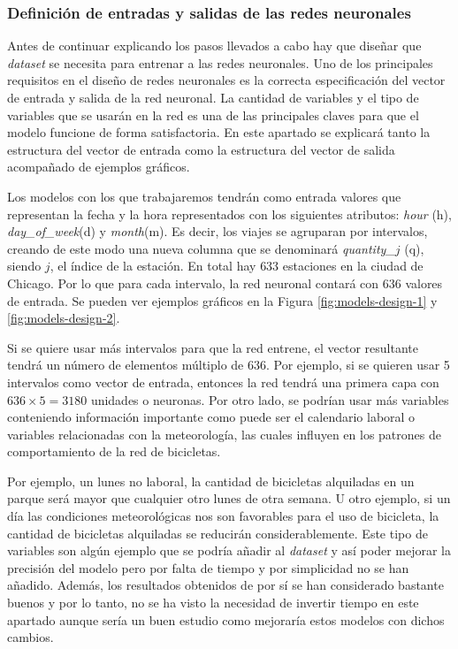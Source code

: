 \subsubsection{Definición de entradas y salidas de las redes neuronales}\label{inputs-outputs}

Antes de continuar explicando los pasos llevados a cabo hay que diseñar que \textit{dataset} se necesita para entrenar a las redes neuronales. Uno de los principales requisitos en el diseño de redes neuronales es la correcta especificación del vector de entrada y salida de la red neuronal. La cantidad de variables y el tipo de variables que se usarán en la red es una de las principales claves para que el modelo funcione de forma satisfactoria. En este apartado se explicará tanto la estructura del vector de entrada como la estructura del vector de salida acompañado de ejemplos gráficos.
\newline

Los modelos con los que trabajaremos tendrán como entrada valores que representan la fecha y la hora representados con los siguientes atributos: \textit{hour} (h), \textit{day\_of\_week}(d) y \textit{month}(m). Es decir, los viajes se agruparan por intervalos, creando de este modo una nueva columna que se denominará \textit{quantity\_$j$} (q), siendo $j$, el índice de la estación. En total hay $633$ estaciones en la ciudad de Chicago. Por lo que para cada intervalo, la red neuronal contará con $636$ valores de entrada. Se pueden ver ejemplos gráficos en la Figura \ref{fig:models-design-1} y \ref{fig:models-design-2}.
\newline

Si se quiere usar más intervalos para que la red entrene, el vector resultante tendrá un número de elementos múltiplo de $636$. Por ejemplo, si se quieren usar 5 intervalos como vector de entrada, entonces la red tendrá una primera capa con $636 \times 5 = 3180$ unidades o neuronas. Por otro lado, se podrían usar más variables conteniendo información importante como puede ser el calendario laboral o variables relacionadas con la meteorología, las cuales influyen en los patrones de comportamiento de la red de bicicletas.
\newline

Por ejemplo, un lunes no laboral, la cantidad de bicicletas alquiladas en un parque será mayor que cualquier otro lunes de otra semana. U otro ejemplo, si un día las condiciones meteorológicas nos son favorables para el uso de bicicleta, la cantidad de bicicletas alquiladas se reducirán considerablemente. Este tipo de variables son algún ejemplo que se podría añadir al \textit{dataset} y así poder mejorar la precisión del modelo pero por falta de tiempo y por simplicidad no se han añadido. Además, los resultados obtenidos de por sí se han considerado bastante buenos y por lo tanto, no se ha visto la necesidad de invertir tiempo en este apartado aunque sería un buen estudio como mejoraría estos modelos con dichos cambios.
\newline

